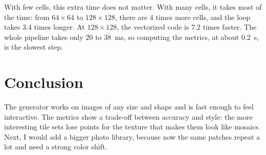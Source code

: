 \documentclass[10pt]{article}
\begin{document}
With few cells, this extra time does not matter. With many cells, it takes most of the time: from $64 \times 64$ to $128 \times 128$, there are 4 times more cells, and the loop takes 3.4 times longer. At $128 \times 128$, the vectorized code is 7.2 times faster. The whole pipeline takes only 20 to 38~ms, so computing the metrics, at about 0.2~s, is the slowest step.

\section{Conclusion}
The generator works on images of any size and shape and is fast enough to feel interactive. The metrics show a trade-off between accuracy and style: the more interesting tile sets lose points for the texture that makes them look like mosaics. Next, I would add a bigger photo library, because now the same patches repeat a lot and need a strong color shift.
\end{document}
